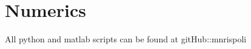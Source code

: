 
\begin{savequote}[75mm]

\end{savequote}


\chapter{Numerics}
\label{append:Numerics}

All python and matlab scripts can be found at gitHub::mnrispoli

